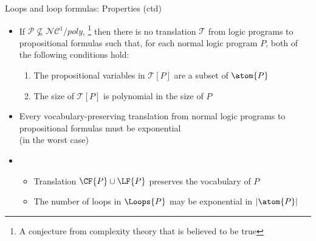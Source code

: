 \begin{frame}{Loops and loop formulas: Properties (ctd)}
\bigskip
\begin{itemize}
\item {}
  If ${\mathcal{P}} \not\subseteq {\mathcal{NC}}^1\!/\mathit{poly}$,%
  \footnote{A conjecture from complexity theory that is believed to be true}
  then there is no translation $\mathcal{T}$
  from logic programs to propositional formulas
  such that, for each normal logic program $P$,
  both of the following conditions hold:
  \begin{enumerate}
  \item The propositional variables in $\mathcal{T}[P]$ are a subset of $\atom{P}$
  \item The size of $\mathcal{T}[P]$ is polynomial in the size of $P$
\end{enumerate}
\medskip
\item<2->  Every vocabulary-preserving translation from normal logic programs to
  propositional formulas must be exponential\\
  (in the worst case)
\medskip
\item<3->
  \begin{itemize}
  \item Translation $\CF{P}\cup\LF{P}$ preserves the vocabulary of $P$
  \item The number of loops in $\Loops{P}$ may be exponential in $|\atom{P}|$
  \end{itemize}
\end{itemize}
\end{frame}
%
